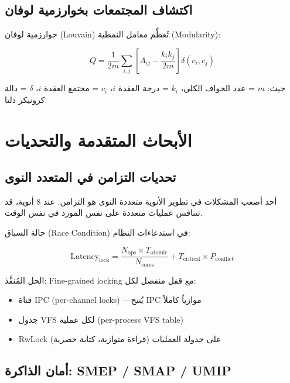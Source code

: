 \documentclass[12pt,a4paper]{article}
\theoremstyle{definition}
\newcommand{\en}[1]{\textenglish{#1}}
\begin{document}
\subsection{اكتشاف المجتمعات بخوارزمية لوفان}

خوارزمية لوفان (\en{Louvain}) تُعظِّم معامل النمطية (Modularity):

\begin{equation}
Q = \frac{1}{2m}\sum_{i,j}\left[A_{ij} - \frac{k_i k_j}{2m}\right]\delta(c_i, c_j)
\end{equation}

حيث: $m$ = عدد الحواف الكلي، $k_i$ = درجة العقدة $i$، $c_i$ = مجتمع العقدة $i$، $\delta$ = دالة كرونيكر دلتا.

\newpage

\section{الأبحاث المتقدمة والتحديات}

\subsection{تحديات التزامن في المتعدد النوى}

أحد أصعب المشكلات في تطوير الأنوية متعددة النوى هو التزامن. عند 8 أنوية، قد تتنافس عمليات متعددة على نفس المورد في نفس الوقت.

حالة السباق (Race Condition) في استدعاءات النظام:

\begin{equation}
\mathrm{Latency}_{\mathrm{lock}} = \frac{N_{\mathrm{ops}} \times T_{\mathrm{atomic}}}{N_{\mathrm{cores}}}
  + T_{\mathrm{critical}} \times P_{\mathrm{conflict}}
\end{equation}

الحل المُنفَّذ: Fine-grained locking مع قفل منفصل لكل:
\begin{itemize}[leftmargin=2em]
\item قناة IPC (per-channel locks) ---يُتيح IPC موازياً كاملاً
\item جدول VFS لكل عملية (per-process VFS table)
\item RwLock على جدولة العمليات (قراءة متوازية، كتابة حصرية)
\end{itemize}

\subsection{أمان الذاكرة: SMEP / SMAP / UMIP}
\end{document}
